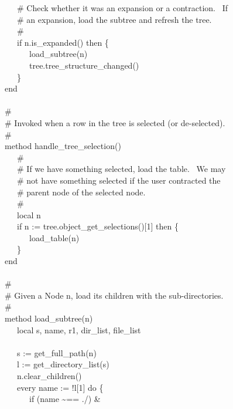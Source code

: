 {\>   \ \ \ \# Check whether it was an expansion or a contraction. \ If \\
\>   \ \ \ \# an expansion, load the subtree and refresh the tree. \\
\>   \ \ \ \# \\
\>   \ \ \ if n.is\_expanded() then \{ \\
\>   \ \ \ \ \ \ load\_subtree(n) \\
\>   \ \ \ \ \ \ tree.tree\_structure\_changed() \\
\>   \ \ \ \} \\
\>   end \\
\ \\
\>   \# \\
\>   \# Invoked when a row in the tree is selected (or de-selected). \\
\>   \# \\
\>   method handle\_tree\_selection() \\
\>   \ \ \ \# \\
\>   \ \ \ \# If we have something selected, load the table. \ We may  \\
\>   \ \ \ \# not have something selected if the user contracted the \\
\>   \ \ \ \# parent node of the selected node. \\
\>   \ \ \ \# \\
\>   \ \ \ local n \\
\>   \ \ \ if n := tree.object\_get\_selections()[1] then \{ \\
\>   \ \ \ \ \ \ load\_table(n) \\
\>   \ \ \ \} \\
\>   end \\
\ \\
\>   \# \\
\>   \# Given a Node n, load its children with the sub-directories. \\
\>   \# \\
\>   method load\_subtree(n) \\
\>   \ \ \ local s, name, r1, dir\_list, file\_list \\
\ \\
\>   \ \ \ s := get\_full\_path(n) \\
\>   \ \ \ l := get\_directory\_list(s) \\
\>   \ \ \ n.clear\_children() \\
\>   \ \ \ every name := !l[1] do \{ \\
\>   \ \ \ \ \ \ if (name \~{}== {\textquotedbl}./{\textquotedbl}) \&
}

